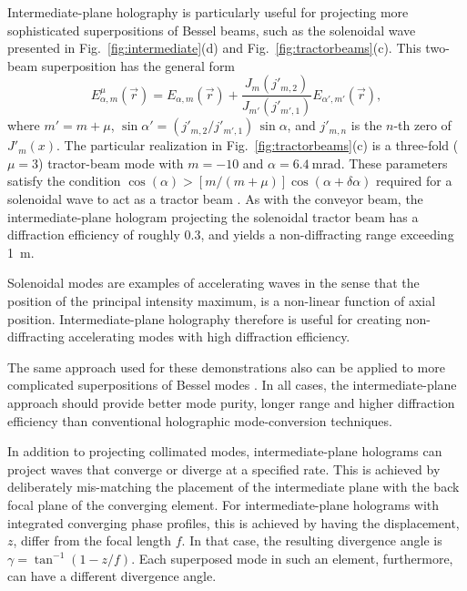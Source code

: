 Intermediate-plane holography is particularly useful for projecting
more sophisticated superpositions of Bessel beams, such
as the solenoidal wave presented in Fig.~\ref{fig:intermediate}(d) and
Fig.~\ref{fig:tractorbeams}(c).
This two-beam superposition has the general form
\begin{equation}
  \label{eq:solenoid}
  E_{\alpha,m}^{\mu}(\vec{r})
  =
  E_{\alpha,m}(\vec{r})
  +
  \frac{J_m(j'_{m,2})}{J_{m'}(j'_{m',1})}
  E_{\alpha',m'}(\vec{r}),
\end{equation}
where $m' = m + \mu$,
$\sin\alpha' = (j'_{m,2}/j'_{m',1}) \, \sin\alpha$, and
$j'_{m,n}$ is the $n$-th zero of $J'_m(x)$.
The particular realization in Fig.~\ref{fig:tractorbeams}(c)
is a three-fold ($\mu = 3$) tractor-beam mode \cite{yevick16}
with $m = -10$ and $\alpha = \SI{6.4}{\milli\radian}$.
These parameters satisfy the condition
$\cos(\alpha) > [m/(m + \mu)] \cos(\alpha + \delta \alpha)$
required for a solenoidal wave to act as a tractor beam
\cite{yevick16}.
As with the conveyor beam, the intermediate-plane hologram
projecting the solenoidal tractor beam has a diffraction
efficiency of roughly \num{0.3}, and yields a non-diffracting
range exceeding \SI{1}{\meter}.

Solenoidal modes are examples of accelerating waves \cite{berry79}
in the sense that the position of the principal intensity maximum,
is a non-linear function of axial position.
Intermediate-plane holography therefore is useful for creating
non-diffracting accelerating modes with high diffraction efficiency.

The same approach used for these demonstrations also can be
applied to more complicated superpositions of Bessel modes
\cite{cizmar09,vasilyeu09,lee10,litvin11}. %
In all cases, the intermediate-plane approach should provide
better mode purity, longer range and higher diffraction efficiency
than conventional holographic mode-conversion techniques.

In addition to projecting collimated modes, intermediate-plane
holograms can project waves that converge or diverge at
a specified rate.  This is achieved by deliberately mis-matching
the placement of the intermediate plane with the back focal
plane of the converging element.  For intermediate-plane holograms
with integrated converging phase profiles, this is achieved by
having the displacement, $z$, differ from the focal length $f$.
In that case, the resulting divergence angle is
$\gamma = \tan^{-1}(1 - z/f)$. %
Each superposed mode in such an element, furthermore, can have
a different divergence angle.

